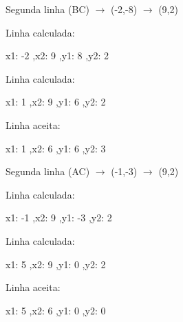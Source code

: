 \begin{enumerate}
		Segunda linha (BC) $\rightarrow$ (-2,-8) $\rightarrow$ (9,2)

		Linha calculada: 
		
 		x1: -2 ,x2: 9 ,y1: 8 ,y2: 2

		Linha calculada: 
		
		 x1: 1 ,x2: 9 ,y1: 6 ,y2: 2

		Linha aceita: 
		
 		x1: 1 ,x2: 6 ,y1: 6 ,y2: 3
 		
 		Segunda linha (AC) $\rightarrow$ (-1,-3) $\rightarrow$ (9,2)

		Linha calculada: 
		
 		x1: -1 ,x2: 9 ,y1: -3 ,y2: 2

		Linha calculada: 
		
		x1: 5 ,x2: 9 ,y1: 0 ,y2: 2

		Linha aceita: 
		
		x1: 5 ,x2: 6 ,y1: 0 ,y2: 0
		
	\end{enumerate}
